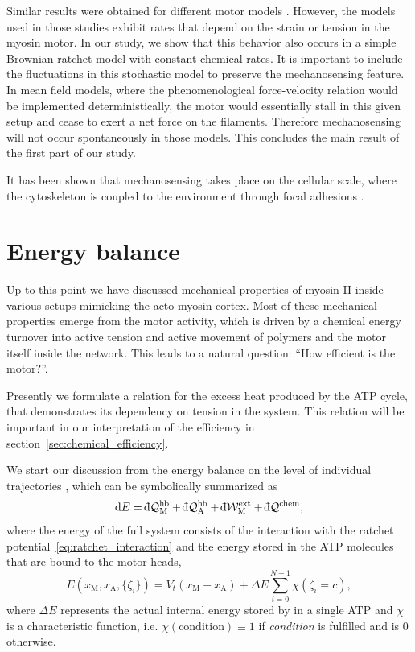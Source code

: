 \documentclass[aps,pre,twocolumn,showpacs,showkeys,superscriptaddress,floatfix]{revtex4-1}
\newcommand{\rmd}{{\mathrm d}}
\newcommand{\dbar}{{\mathchar '26 \mkern-11mu {\mathrm d}}}
\begin{document}
Similar results were obtained for different motor models \cite{stam2015isoforms,Albert2014}. 
However, the models used in those studies exhibit rates that depend on the strain or tension in the myosin motor. 
In our study, we show that this behavior also occurs in a simple Brownian ratchet model with constant chemical rates.
It is important to include the fluctuations in this stochastic model to preserve the mechanosensing feature.
In mean field models, where the phenomenological force-velocity relation would be implemented deterministically, 
the motor would essentially stall in this given setup and cease to exert a net force on the filaments. 
Therefore mechanosensing will not occur spontaneously in those models.
This concludes the main result of the first part of our study. 

It has been shown that mechanosensing takes place on the cellular scale, 
where the cytoskeleton is coupled to the environment through focal adhesions \cite{geiger2009environmental,etienne2015cells}.

\section{Energy balance}
\label{sec:energie}
Up to this point we have discussed mechanical properties of myosin II inside various setups mimicking the acto-myosin cortex. 
Most of these mechanical properties emerge from the motor activity, 
which is driven by a chemical energy turnover into active tension and active movement of polymers and the motor itself inside the network. 
This leads to a natural question: ``How efficient is the motor?''. 

Presently we formulate a relation for the excess heat produced by the ATP cycle, that demonstrates its dependency on tension in the system.
This relation will be important in our interpretation of the efficiency in section~\ref{sec:chemical_efficiency}.

We start our discussion from the energy balance on the level of individual trajectories \cite{Pesek2013},
which can be symbolically summarized as 
\begin{equation}
\rmd E = \dbar {\mathcal Q}_\text{M}^\text{hb} + \dbar {\mathcal Q}_\text{A}^\text{hb} + \dbar {\mathcal W}^\text{ext}_\text{M} + \dbar {\mathcal Q}^\text{chem}, 
\label{eq:energy_balance}
\end{equation}
where the energy of the full system consists of the interaction with the ratchet potential~\eqref{eq:ratchet_interaction}
and the energy stored in the ATP molecules that are bound to the motor heads,
\begin{equation}
E( x_\text{M}, x_\text{A}, \{ \zeta_i \}) = V_t( x_\text{M} - x_\text{A} ) + \Delta E \sum\limits_{i=0}^{N-1} \chi( \zeta_i = c ) ,
\label{eq:internal_energy}
\end{equation}
where $\Delta E$ represents the actual internal energy stored by in a single ATP and $\chi$ is a characteristic function, 
i.e. $\chi(\text{condition}) \equiv 1$ if \emph{condition} is fulfilled and is $0$ otherwise. 
\end{document}
